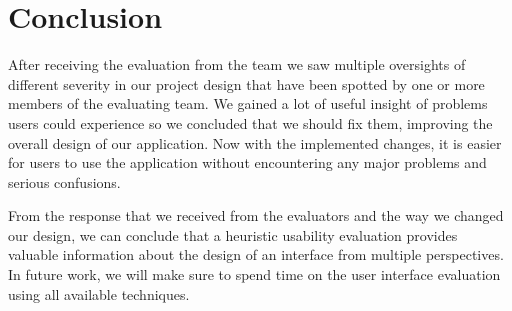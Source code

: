 \section{Conclusion}

After receiving the evaluation from the team we saw multiple oversights of different severity in our project design that have been spotted by one or more members of the evaluating team. We gained a lot of useful insight of problems users could experience so we concluded that we should fix them, improving the overall design of our application. Now with the implemented changes, it is easier for users to use the application without encountering any major problems and serious confusions. 

From the response that we received from the evaluators and the way we changed our design, we can conclude that a heuristic usability evaluation provides valuable information about the design of an interface from multiple perspectives. In future work, we will make sure to spend time on the user interface evaluation using all available techniques.
